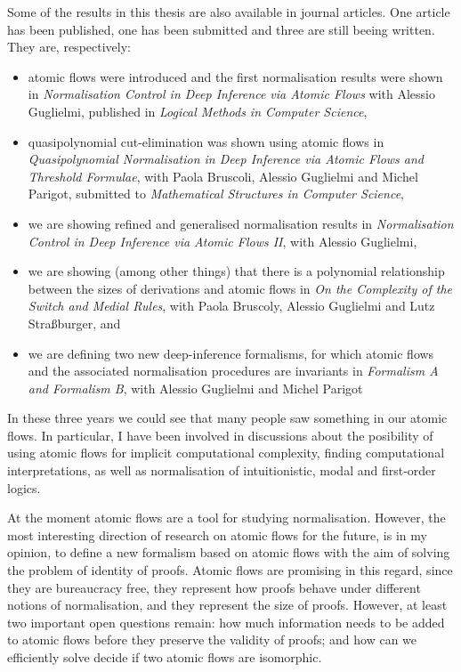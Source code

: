 Some of the results in this thesis are also available in journal articles. One article has been published, one has been submitted and three are still beeing written. They are, respectively:
\begin{itemize}
 \item atomic flows were introduced and the first normalisation results were shown in \emph{Normalisation Control in Deep Inference via Atomic Flows} with Alessio Guglielmi, published in \emph{Logical Methods in Computer Science},
 \item quasipolynomial cut-elimination was shown using atomic flows in \emph{Quasipolynomial Normalisation in Deep Inference via Atomic Flows and Threshold Formulae}, with Paola Bruscoli, Alessio Guglielmi and Michel Parigot, submitted to \emph{Mathematical Structures in Computer Science},
 \item we are showing refined and generalised normalisation results in \emph{Normalisation Control in Deep Inference via Atomic Flows II}, with Alessio Guglielmi,
 \item we are showing (among other things) that there is a polynomial relationship between the sizes of derivations and atomic flows in \emph{On the Complexity of the Switch and Medial Rules}, with Paola Bruscoly, Alessio Guglielmi and Lutz Stra\ss{}burger, and
 \item we are defining two new deep-inference formalisms, for which atomic flows and the associated normalisation procedures are invariants in \emph{Formalism A and Formalism B}, with Alessio Guglielmi and Michel Parigot
\end{itemize}

In these three years we could see that many people saw something in our atomic flows. In particular, I have been involved in discussions about the posibility of using atomic flows for implicit computational complexity, finding computational interpretations, as well as normalisation of intuitionistic, modal and first-order logics.

At the moment atomic flows are a tool for studying normalisation. However, the most interesting direction of research on atomic flows for the future, is in my opinion, to define a new formalism based on atomic flows with the aim of solving the problem of identity of proofs. Atomic flows are promising in this regard, since they are bureaucracy free, they represent how proofs behave under different notions of normalisation, and they represent the size of proofs. However, at least two important open questions remain: how much information needs to be added to atomic flows before they preserve the validity of proofs; and how can we efficiently solve decide if two atomic flows are isomorphic.


